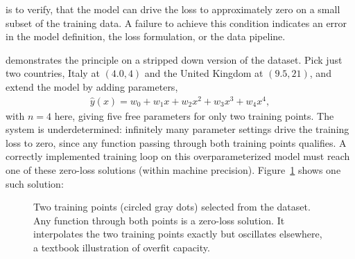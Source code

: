 
 is to verify,
that the model can drive the loss to approximately zero on a small subset of the training data.
A failure to achieve this condition indicates an error in the model definition,
the loss formulation,
or the data pipeline.


 demonstrates the principle on a stripped down version of the dataset.
Pick just two countries, Italy at $(4.0, 4)$ and the United Kingdom at $(9.5, 21)$,
and extend the model by adding parameters,
\begin{align*}
    \hat{y}(x) = w_0 + w_1 x + w_2 x^2 + w_3 x^3 + w_4 x^4,
\end{align*}
with $n = 4$ here, giving five free parameters for only two training points.
The system is underdetermined:
infinitely many parameter settings drive the training loss to zero,
since any function passing through both training points qualifies.
A correctly implemented training loop on this overparameterized model must 
reach one of these zero-loss solutions (within machine precision).
Figure~\ref{fig:overfit_polynomial} shows one such solution:

\begin{figure}[h]
    \centering
    \caption{Two training points (circled gray dots) selected from the dataset.
    Any function through both points is a zero-loss solution.
    It interpolates the two training points exactly but oscillates elsewhere,
    a textbook illustration of overfit capacity.}
    \label{fig:overfit_polynomial}
\end{figure}

